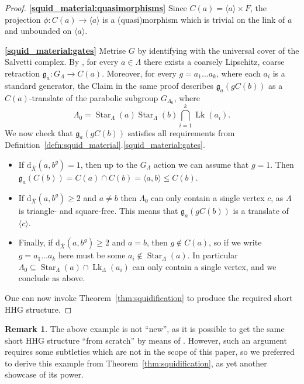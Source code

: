 \documentclass[svgnames]{amsart}
\theoremstyle{plain}
\theoremstyle{definition}
\newtheorem{rem}[thm]{Remark}
\newcommand{\ov}[1]{\overline{#1}}
\newcommand{\dist}{\mathrm{d}}
\newcommand{\link}{\operatorname{Lk}}
\newcommand{\gate}{\mathfrak{g}}
\begin{document}
\begin{proof}
\par\medskip
\textbf{\eqref{squid_material:quasimorphisms}} Since $C(a)=\langle a\rangle \times F$, the projection $\phi\colon C(a)\to\langle a\rangle$ is a (quasi)morphism which is trivial on the link of $a$ and unbounded on $\langle a\rangle$.

\par\medskip
\textbf{\eqref{squid_material:gates}} Metrise $G$ by identifying with the universal cover of the Salvetti complex. By \cite[Proposition 8.3]{HHS_I}, for every $a\in \Lambda$ there exists a coarsely Lipschitz, coarse retraction $\gate_a\colon G_\Lambda\to C(a)$. Moreover, for every $g=a_1\ldots a_k$, where each $a_i$ is a standard generator, the Claim in the same proof describes $\gate_a(g C(b))$ as a $C(a)$-translate of the parabolic subgroup $G_{\Lambda_0}$, where 
$$\Lambda_0=\operatorname{Star}_{\Lambda} (a)\operatorname{Star}_{\Lambda}(b)\bigcap_{i=1}^k\link(a_i).$$ 
We now check that $\gate_a(g C(b))$ satisfies all requirements from Definition~\ref{defn:squid_material}.\eqref{squid_material:gates}.

\begin{itemize}
    \item If $\dist_{\ov X}(a, b^g)= 1$, then up to the $G_\Lambda$ action we can assume that $g=1$. Then $\gate_a(C(b))=C(a)\cap C(b)=\langle a,b\rangle \le C(b)$. 
    \item If $\dist_{\ov X}(a, b^g)\ge 2$ and $a\neq b$ then $\Lambda_0$ can only contain a single vertex $c$, as $\Lambda$ is triangle- and square-free. This means that $\gate_a(g C(b))$ is a translate of $\langle c\rangle$.
    \item Finally, if $\dist_{\ov X}(a, b^g)\ge 2$ and $a=b$, then $g\not\in C(a)$, so if we write $g=a_1\ldots a_k$ here must be some $a_i\not\in \operatorname{Star}_{\Lambda}(a)$. In particular 
    $\Lambda_0\subseteq \operatorname{Star}_{\Lambda}(a)\cap \link_\Lambda(a_i)$ can only contain a single vertex, and we conclude as above. 
\end{itemize}
One can now invoke Theorem~\ref{thm:squidification} to produce the required short HHG structure.
\end{proof}

\begin{rem}
    The above example is not ``new'', as it is possible to get the same short HHG structure ``from scratch'' by means of \cite[Theorem 3.15]{converse}. However, such an argument requires some subtleties which are not in the scope of this paper, so we preferred to derive this example from Theorem~\ref{thm:squidification}, as yet another showcase of its power.
\end{rem}
\end{document}
